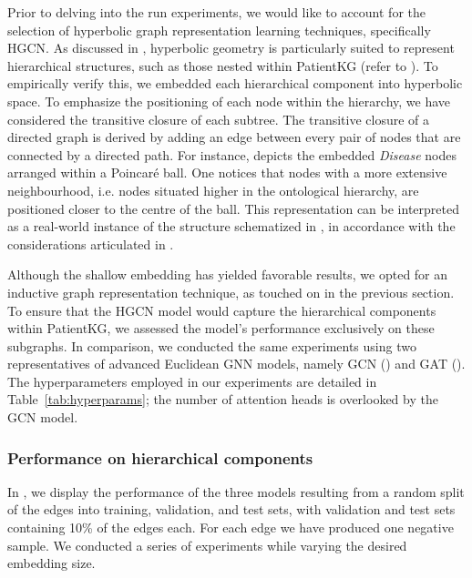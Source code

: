
Prior to delving into the run experiments, we would like to account for the selection of hyperbolic graph representation learning techniques, specifically HGCN. As discussed in , hyperbolic geometry is particularly suited to represent hierarchical structures, such as those nested within PatientKG (refer to ). To empirically verify this, we embedded each hierarchical component into hyperbolic space. To emphasize the positioning of each node within the hierarchy, we have considered the transitive closure of each subtree. The transitive closure of a directed graph is derived by adding an edge between every pair of nodes that are connected by a directed path. For instance,  depicts the embedded \emph{Disease} nodes arranged within a Poincaré ball. One notices that nodes with a more extensive neighbourhood, i.e. nodes situated higher in the ontological hierarchy, are positioned closer to the centre of the ball. This representation can be interpreted as a real-world instance of the structure schematized in , in accordance with the considerations articulated in . 


Although the shallow embedding has yielded favorable results, we opted for an inductive graph representation technique, as touched on in the previous section. To ensure that the HGCN model would capture the hierarchical components within PatientKG, we assessed the model's performance exclusively on these subgraphs. In comparison, we conducted the same experiments using two representatives of advanced Euclidean GNN models, namely GCN () and GAT (). The hyperparameters employed in our experiments are detailed in Table~\ref{tab:hyperparams}; the number of attention heads is overlooked by the GCN model. 

\subsubsection{Performance on hierarchical components}

In , we display the performance of the three models resulting from a random split of the edges into training, validation, and test sets, with validation and test sets containing 10\% of the edges each. For each edge we have produced one negative sample. We conducted a series of experiments while varying the desired embedding size. 

